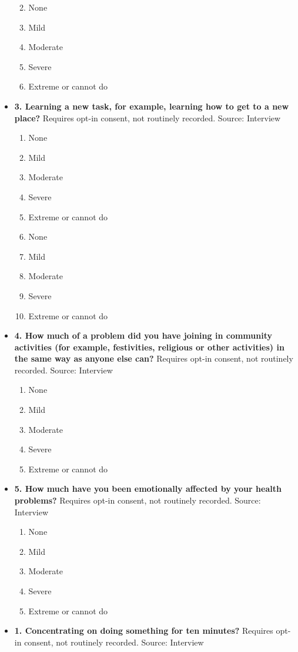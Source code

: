 \documentclass[
]{scrartcl}
\providecommand{\tightlist}{%
  \setlength{\itemsep}{0pt}\setlength{\parskip}{0pt}}\usepackage{longtable,booktabs,array}
\begin{document}
\begin{itemize}
  \begin{enumerate}
  \def\labelenumi{\arabic{enumi}.}
  \tightlist
  \item
    None
  \item
    Mild
  \item
    Moderate
  \item
    Severe
  \item
    Extreme or cannot do
  \end{enumerate}
\item
  \textbf{3. Learning a new task, for example, learning how to get to a
  new place?} Requires opt-in consent, not routinely recorded. Source:
  Interview

  \begin{enumerate}
  \def\labelenumi{\arabic{enumi}.}
  \tightlist
  \item
    None
  \item
    Mild
  \item
    Moderate
  \item
    Severe
  \item
    Extreme or cannot do
  \item
    None
  \item
    Mild
  \item
    Moderate
  \item
    Severe
  \item
    Extreme or cannot do
  \end{enumerate}
\item
  \textbf{4. How much of a problem did you have joining in community
  activities (for example, festivities, religious or other activities)
  in the same way as anyone else can?} Requires opt-in consent, not
  routinely recorded. Source: Interview

  \begin{enumerate}
  \def\labelenumi{\arabic{enumi}.}
  \tightlist
  \item
    None
  \item
    Mild
  \item
    Moderate
  \item
    Severe
  \item
    Extreme or cannot do
  \end{enumerate}
\item
  \textbf{5. How much have you been emotionally affected by your health
  problems?} Requires opt-in consent, not routinely recorded. Source:
  Interview

  \begin{enumerate}
  \def\labelenumi{\arabic{enumi}.}
  \tightlist
  \item
    None
  \item
    Mild
  \item
    Moderate
  \item
    Severe
  \item
    Extreme or cannot do
  \end{enumerate}
\item
  \textbf{1. Concentrating on doing something for ten minutes?} Requires
  opt-in consent, not routinely recorded. Source: Interview


\end{itemize}
\end{document}
